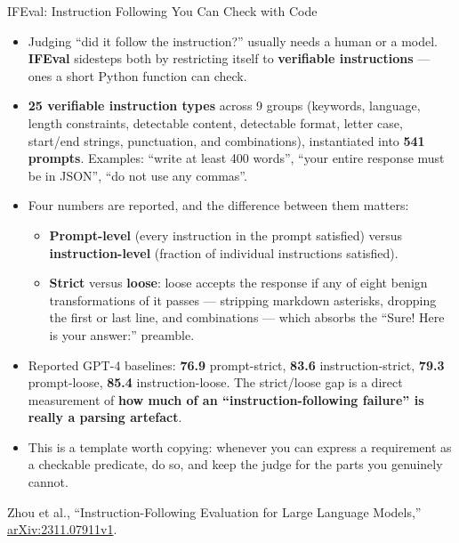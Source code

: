 \begin{frame}[allowframebreaks]{IFEval: Instruction Following You Can Check with Code}
  \begin{itemize}\itemsep0.35em
    \item[\textcolor{red}{$\blacktriangleright$}] Judging ``did it follow the instruction?'' usually needs a human or a model. \textbf{IFEval} sidesteps both by restricting itself to \textbf{verifiable instructions} --- ones a short Python function can check.
    \item[\textcolor{red}{$\blacktriangleright$}] \textbf{25 verifiable instruction types} across 9 groups (keywords, language, length constraints, detectable content, detectable format, letter case, start/end strings, punctuation, and combinations), instantiated into \textbf{541 prompts}. Examples: ``write at least 400 words'', ``your entire response must be in JSON'', ``do not use any commas''.
    \item[\textcolor{red}{$\blacktriangleright$}] Four numbers are reported, and the difference between them matters:
      \begin{itemize}\footnotesize\itemsep0.15em
        \item \textbf{Prompt-level} (every instruction in the prompt satisfied) versus \textbf{instruction-level} (fraction of individual instructions satisfied).
        \item \textbf{Strict} versus \textbf{loose}: loose accepts the response if any of eight benign transformations of it passes --- stripping markdown asterisks, dropping the first or last line, and combinations --- which absorbs the ``Sure! Here is your answer:'' preamble.
      \end{itemize}
    \item[\textcolor{red}{$\blacktriangleright$}] Reported GPT-4 baselines: \textbf{76.9} prompt-strict, \textbf{83.6} instruction-strict, \textbf{79.3} prompt-loose, \textbf{85.4} instruction-loose. The strict/loose gap is a direct measurement of \textbf{how much of an ``instruction-following failure'' is really a parsing artefact}.
    \item[\textcolor{red}{$\blacktriangleright$}] This is a template worth copying: whenever you can express a requirement as a checkable predicate, do so, and keep the judge for the parts you genuinely cannot.
  \end{itemize}
  \vspace{0.1em}
  {\scriptsize Zhou et al., ``Instruction-Following Evaluation for Large Language Models,'' \href{https://arxiv.org/abs/2311.07911v1}{arXiv:2311.07911v1}.}
\end{frame}
